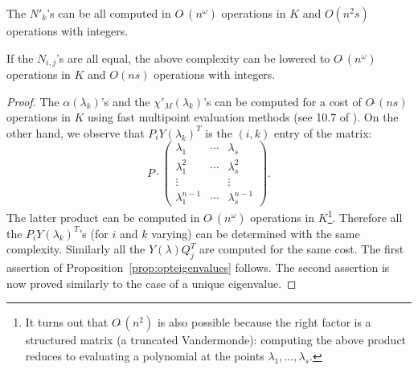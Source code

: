 \documentclass{sig-alternate-05-2015}
\newcommand{\softO}{O\tilde{~}}
\begin{document}
\begin{prop}
\label{prop:opteigenvalues}
The $N'_k$'s can be all computed in $\softO(n^\omega)$ operations
in $K$ and $O(n^2 s)$ operations with integers.

If the $N_{i,j}$'s are all equal, the above complexity can be 
lowered to $\softO(n^\omega)$ operations in $K$ and $O(n s)$ operations 
with integers.
\end{prop}

\begin{proof}
The $\alpha(\lambda_k)$'s and the $\chi'_M(\lambda_k)$'s can be computed 
for a cost of $\softO(ns)$ operations in $K$ using fast multipoint 
evaluation methods (see 10.7 of \cite{gathen-gerhard:13a}).
On the other hand, we observe that $P_i Y(\lambda_k)^T$ is
the $(i,k)$ entry of the matrix:
$$P \cdot \left( \begin{matrix}
\lambda_1 & \cdots & \lambda_s \\
\lambda_1^2 & \cdots & \lambda_s^2 \\
\vdots & & \vdots \\
\lambda_1^{n-1} & \cdots & \lambda_s^{n-1}
\end{matrix} \right).$$
The latter product can be computed in $\softO(n^\omega)$ operations in 
$K$\footnote{It turns out that $\softO(n^2)$ is also possible because
the right factor is a structured matrix (a truncated Vandermonde):
computing the above product reduces to evaluating a polynomial at the
points $\lambda_1, \ldots, \lambda_s$.}. Therefore all the $P_i 
Y(\lambda_k)^T$'s (for $i$ and $k$ varying) 
can be determined with the same complexity. 
Similarly all the $Y(\lambda) Q_j^T$ are computed for the same cost.
The first assertion of Proposition~\ref{prop:opteigenvalues} follows.
The second assertion is now proved similarly to the case of a unique
eigenvalue.
\end{proof}




\end{document}
